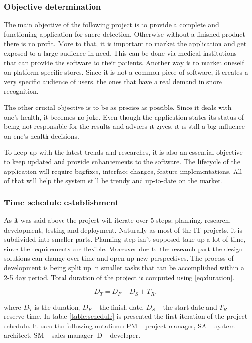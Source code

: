 \subsubsection{Objective determination}
The main objective of the following project is to provide a complete and functioning application for snore detection. Otherwise without a finished product there is no profit. More to that, it is important to market the application and get exposed to a large audience in need. This can be done via medical institutions that can provide the software to their patients. Another way is to market oneself on platform-specific stores. Since it is not a common piece of software, it creates a very specific audience of users, the ones that have a real demand in snore recognition. 

The other crucial objective is to be as precise as possible. Since it deals with one's health, it becomes no joke. Even though the application states its status of being not responsible for the results and advices it gives, it is still a big influence on one's health decisions. 

To keep up with the latest trends and researches, it is also an essential objective to keep updated and provide enhancements to the software. The lifecycle of the application will require bugfixes, interface changes, feature implementations. All of that will help the system still be trendy and up-to-date on the market.

\subsubsection{Time schedule establishment}
As it was said above the project will iterate over 5 steps: planning, research, development, testing and deployment. Naturally as most of the IT projects, it is subdivided into smaller parts. Planning step isn't supposed take up a lot of time, since the requirements are flexible. Moreover due to the research part the design solutions can change over time and open up new perspectives. The process of development is being split up in smaller tasks that can be accomplished within a 2-5 day period. Total duration of the project is computed using \eqref{eq:duration}.

\begin{equation} \label{eq:duration}
 D_T = D_F - D_S + T_R,
\end{equation}

\noindent 
where $D_T$ is the duration, $D_F$ -- the finish date, $D_S$ -- the start date and $T_R$ -- reserve time. In table \ref{table:schedule} is presented the first iteration of the project schedule. It uses the following notations: PM -- project manager, SA -- system architect, SM -- sales manager, D -- developer.

